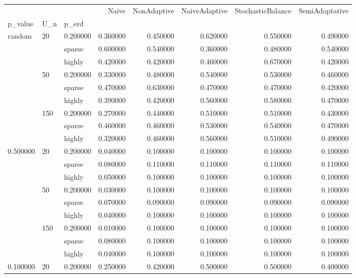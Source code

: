 \begin{tabular}{lllrrrrr}
\toprule
 &  &  & Naive & NonAdaptive & NaiveAdaptive & StochasticBalance & SemiAdaptative \\
p_value & U_n & p_erd &  &  &  &  &  \\
\midrule
\multirow[t]{9}{*}{random} & \multirow[t]{3}{*}{20} & 0.200000 & 0.360000 & 0.450000 & 0.620000 & 0.550000 & 0.490000 \\
 &  & sparse & 0.600000 & 0.540000 & 0.360000 & 0.480000 & 0.540000 \\
 &  & highly & 0.420000 & 0.420000 & 0.460000 & 0.670000 & 0.420000 \\
\cline{2-8}
 & \multirow[t]{3}{*}{50} & 0.200000 & 0.330000 & 0.480000 & 0.540000 & 0.530000 & 0.460000 \\
 &  & sparse & 0.470000 & 0.630000 & 0.470000 & 0.470000 & 0.420000 \\
 &  & highly & 0.390000 & 0.420000 & 0.560000 & 0.580000 & 0.470000 \\
\cline{2-8}
 & \multirow[t]{3}{*}{150} & 0.200000 & 0.270000 & 0.440000 & 0.510000 & 0.510000 & 0.430000 \\
 &  & sparse & 0.460000 & 0.460000 & 0.530000 & 0.540000 & 0.470000 \\
 &  & highly & 0.320000 & 0.460000 & 0.560000 & 0.510000 & 0.490000 \\
\cline{1-8} \cline{2-8}
\multirow[t]{9}{*}{0.500000} & \multirow[t]{3}{*}{20} & 0.200000 & 0.040000 & 0.100000 & 0.100000 & 0.100000 & 0.100000 \\
 &  & sparse & 0.080000 & 0.110000 & 0.110000 & 0.110000 & 0.110000 \\
 &  & highly & 0.050000 & 0.100000 & 0.100000 & 0.100000 & 0.100000 \\
\cline{2-8}
 & \multirow[t]{3}{*}{50} & 0.200000 & 0.030000 & 0.100000 & 0.100000 & 0.100000 & 0.100000 \\
 &  & sparse & 0.070000 & 0.090000 & 0.090000 & 0.090000 & 0.090000 \\
 &  & highly & 0.040000 & 0.100000 & 0.100000 & 0.100000 & 0.100000 \\
\cline{2-8}
 & \multirow[t]{3}{*}{150} & 0.200000 & 0.010000 & 0.100000 & 0.100000 & 0.100000 & 0.100000 \\
 &  & sparse & 0.080000 & 0.100000 & 0.100000 & 0.100000 & 0.100000 \\
 &  & highly & 0.040000 & 0.100000 & 0.100000 & 0.100000 & 0.100000 \\
\cline{1-8} \cline{2-8}
\multirow[t]{9}{*}{0.100000} & \multirow[t]{3}{*}{20} & 0.200000 & 0.250000 & 0.420000 & 0.500000 & 0.500000 & 0.400000 \\

\end{tabular}
